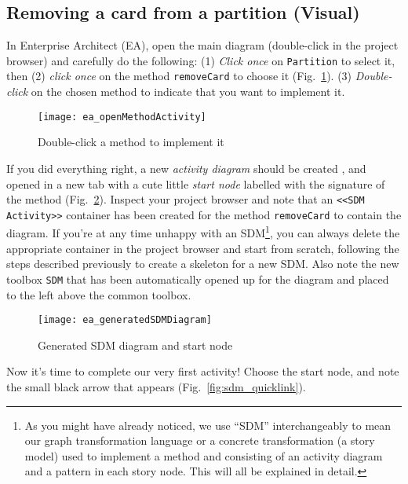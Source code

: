 \newpage
\subsection{Removing a card from a partition (Visual)}
\visHeader
\hypertarget{remCard vis}{}

In Enterprise Architect (EA), open the main diagram (double-click in the project browser) and carefully do the following: (1) \emph{Click once} on
\texttt{Partition} to select it, then (2) \emph{click once} on the method \texttt{removeCard} to choose it (Fig.~\ref{fig:sdm_start}). (3) \emph{Double-click}
on the chosen method to indicate that you want to implement it.

\begin{figure}[htp]
\begin{center}
  \texttt{[image: ea\_openMethodActivity]}
  \caption{Double-click a method to implement it}  
  \label{fig:sdm_start}
\end{center}
\end{figure}
 
If you did everything right, a new \emph{activity diagram} should be created , and opened in a new tab with a cute little \emph{start node} 
labelled with the signature of the method (Fig.~\ref{fig:sdm_skeleton}).  Inspect your project browser and note that an \texttt{<<SDM
Activity>>} container has been created for the method \texttt{removeCard} to contain the diagram. If you're at any time unhappy with an SDM\footnote{As you
might have already noticed, we use ``SDM'' interchangeably to mean our graph transformation language or a concrete transformation (a story model) used to
implement a method and consisting of an activity diagram and a pattern in each story node. This will all be explained in detail.}, you can always delete the
appropriate container in the project browser and start from scratch, following the steps described previously to create a skeleton for a new SDM. Also note the
new toolbox \texttt{SDM} that has been automatically opened up for the diagram and placed to the left above the common toolbox.

\begin{figure}[htp]
\begin{center}
  \texttt{[image: ea\_generatedSDMDiagram]}
  \caption{Generated SDM diagram and start node}  
  \label{fig:sdm_skeleton}
\end{center}
\end{figure}

Now it's time to complete our very first activity! Choose the start node, and note the small black arrow that appears (Fig.~\ref{fig:sdm_quicklink}).

